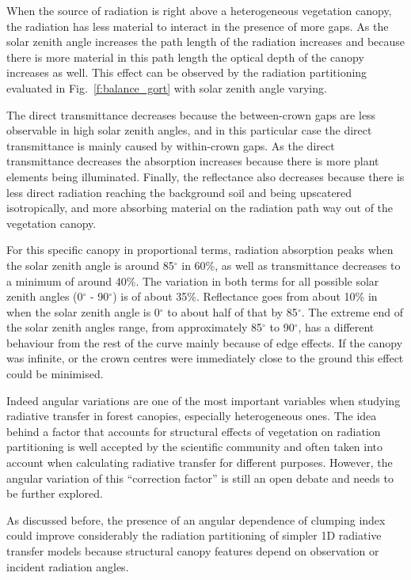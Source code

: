 \documentclass[a4paper,11pt]{report}
\begin{document}
When the source of radiation is right above a heterogeneous vegetation canopy, the radiation has less material to interact in the presence of more gaps. As the solar zenith angle increases the path length of the radiation increases and because there is more material in this path length the optical depth of the canopy increases as well. This effect can be observed by the radiation partitioning evaluated in Fig.~\ref{f:balance_gort} with solar zenith angle varying. 

The direct transmittance decreases because the between-crown gaps are less observable in high solar zenith angles, and in this particular case the direct transmittance is mainly caused by within-crown gaps. As the direct transmittance decreases the absorption increases because there is more plant elements being illuminated. Finally, the reflectance also decreases because there is less direct radiation reaching the background soil and being upscatered isotropically, and more absorbing material on the radiation path way out of the vegetation canopy.

For this specific canopy in proportional terms, radiation absorption peaks when the solar zenith angle is around 85$^{\circ}$ in 60\%, as well as transmittance decreases to a minimum of around 40\%. The variation in both terms for all possible solar zenith angles (0$^{\circ}$ - 90$^{\circ}$) is of about 35\%. Reflectance goes from about 10\% in when the solar zenith angle is 0$^{\circ}$ to about half of that by 85$^{\circ}$. The extreme end of the solar zenith angles range, from approximately 85$^{\circ}$ to 90$^{\circ}$, has a different behaviour from the rest of the curve mainly because of edge effects. If the canopy was infinite, or the crown centres were immediately close to the ground this effect could be minimised. 

Indeed angular variations are one of the most important variables when studying radiative transfer in forest canopies, especially heterogeneous ones. The idea behind a factor that accounts for structural effects of vegetation on radiation partitioning is well accepted by the scientific community and often taken into account when calculating radiative transfer for different purposes. However, the angular variation of this ``correction factor'' is still an open debate and needs to be further explored. 

As discussed before, the presence of an angular dependence of clumping index could improve considerably the radiation partitioning of simpler 1D radiative transfer models because structural canopy features depend on observation or incident radiation angles. 
\end{document}
